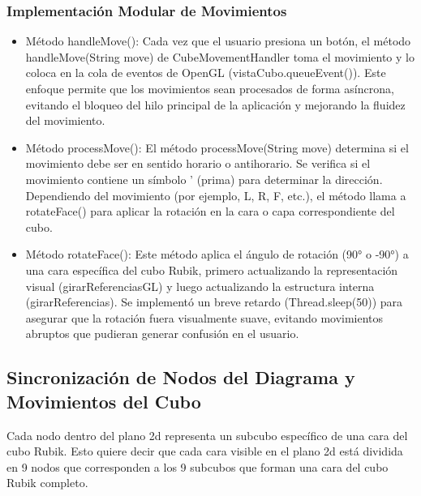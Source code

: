                                                                                                                                                                                                                                                                                                                                                                                                                                                                                                                                                                                                                                                                                                                                                                                                                                                                                                                                                                                                                                                                                                                                                                                                                                                                                                                                                                                                                                                                                                                                                                                                                                                                                                                                                                                                                                                                                                                                                                                                                                                                                                                                                                                                                                                                                                                                                                                                                                                                                                                                                                                                                                                                                                                                                                                                                                                                                                                                                                                                                                                                                                                                                                                                                                                                                                                                                                                                                                                                                                                                                                                                                                                                                                                                                                                                                                                                                                                                                                                                                                                                                                                                                                                                                                                                                                                                                                                                                                                                                                                                                                                                                                                                                                                                                                                                                                                                                                                                                                                                                                                                                                                                                                                                                                                                                                                                                                                                                                                                                                                                                                                                                                                                                                                                                                                                                                                                                                                                                                                                                                                                                                                                                                                                                                                                                                                                                                                                                                                                                                                                                                                                                                                                                                                                                                                                                                                                                                                                                                                                                                                                                                                                                                                                                                                                                                                                                                                                                                                                                                                                                                                                                                                                                                                                                                                                                                                                                                                                                                                                                                                                                                                                                                                                                                                                                                                                                                                                                                                                                                                                                                                                                                                                                                                                                                                                                                                                                                                                                                                                                                                                                                                                                                                                                                                                                                                                                                                                                                                                                                                                                                                                                                                                                                                                                                                                                                                                                                                                                                                                                                                                                                                                                                                                                                                                                                                                                                                                                                                                                                                                                                                                                                                                                                                                                                                                                                                                                                                                                                                                                                                                                                                                                                                                                                                                                                                                                                                                                                                                                                                                                                                                                                                                                                                                                                                                                                                                                                                                                                                                                                                                                                                                                                                                                                                                                                                                                                                                                                                                                                                                                                                                                                                                                                                                                                                                                                                                                                                                                                                                                                                                                                                                                                                                                                                                                                                                                                                                                                                                                                                                                                                                                                                                                                                                                                                                                                                                                                                                                                                                                                                                                                                                                                                                                                                                                                                                                                                                                                                                                                                                                                                                                                                                                                                                                                                                                                                                                                                                                                                                                                                                                                                                                                                                                                                                                                                                                                                                                                                                                                                                                                                                                                                                                                                                                                                                                                                                                                                                                                                                                                                                                                                                                                                                                                                                                                                                                                                                                                                                                                                                                                                                                                                                                                                                                                                                                                                                                                                                                                                                                                                                                                                                                                                                                                                                                                                                                                                                                                                                                                                                                                                                                                                                                                                                                                                                                                                                                                                                                                                                                                                                                                                                                                                                                                                                                                                                                                                                                                                                                                                                                                                                                                                                                                                                                                                                                                                                                                                                                                                                                                                                                                                                                                                                                                                                                                                                                                                                                                                                                                                                                                                                                                                                                                                                                                                                                                                                                                                                                                                                                                                                                                                                                                                                                                                                                                                                                                                                                                                                                                                                                                                                                                                                                                                                                                                                                                                                                                                                                                                                                                                                                                                                                                                                                                                                                                                                                                                                                                                                                                                                                                                                                                                                                                                                                                                                                                                                                                                                                                                                                                                                                                                                                                                                                                                                                                                                                                                                                                                                                                                                                                                                                                                                                                                                                                                                                                                                                                                                                                                                                                                                                                                                                                                                                                                                                                                                                                                                                                                                                                                                                                                                                                                                                                                                                                                                                                                                                                                                                                                                                                                                                                                                                                                                                                                                                                                                                                                                                                                                                                                                                                                                                                                                                                                                                                                                                                                                                                                                                                                                                                                                                                                                                                                                                                                                                                                                                                                                                                                                                                                                                                                                                                                                                                                                                                                                                                                                                                                                                                                                                                                                                                                                                                                                                                                                                                                                                                                                                                                                                                                                                                                                                                                                                                                                                                                                                                                                                                                                                                                                                                                                                                                                                                                                                                                                                                                                                                                                                                                                                                                                                                                                                                                                                                                                                                                                                                                                                                                                                                                                                                                                                                                                                                                                                                                                                                                                                                                                                                                                                                                                                                                                                                                                                                                                                                                                                                                                                                                                                                                                                                                                                                                                                                                                                                                                                                                                                                                                                                                                                                                                                                                                                                                                                                                                                                                                                                                                                                                                                                                                                                                                                                                                                                                                                                                                                                                                                                                                                                                                                                                                                                                                                                                                                                                                                                                                                                                                                                                                                                                                                                                                                                                                                                                                                                                                                                                                                                                                                                                                                                                                                                                                                                                                                                                                                                                                                                                                                                                                                                                                                                                                                                                                                                                                                                                                                                                                                                                                                                                                                                                                                                                                                                                                                                                                                                                                                                                                                                                                                                                                                                                                                                                                                                                                                                                                                                                                                                                                                                                                                                                                                                                                                                                                                                                                                                                                                                                                                                                                                                                                                                                                                                                                                                                                                                                                                                                                                                                                                                                                                                                                                                                                                                                                                                                                                                                                                                                                                                                                                                                                                                                                                                                                                                                                                                                                                                                                                                                                                                                                                                                                                                                                                                                                                                                                                                                                                                                                                                                                                                                                                                                                                                                                                                                                                                                                                                                                                                                                                                                                                                                                                                                                                                                                                                                                                                                                                                                                                                                                                                                                                                                                                                                                                                                                                                                                                                                                                                                                                                                                                                                                                                                                                                                                                                                                                                                                                                                                                                                                                                                                                                                                                                                                                                                                                                                                                                                                                                                                                                                                                                                                                                                                                                                                                                                                                                                                                                                                                                                                                                                                                                                                                                                                                                                                                                                                                                                                                                                                                                                                                                                                                                                                                                                                                                                                                                                                                                                                                                                                                                                                                                                                                                                                                                                                                                                                                                                                                                                                                                                                                                                                                                                                                                                                                                                                                                                                                                                                                                                                                                                                                                                                                                                                                                                                                                                                                                                                                                                                                                                                                                                                                                                                                                                                                                                                                                                                                                                                                                                                                                                                                                                                                                                                                                                                                                                                                                                                                                                                                                                                                                                                                                                                                                                                                                                                                                                                                                                                                                                                                                                                                                                                                                                                                                                                                                                                                                                                                                                                                                                                                                                                                                                                                                                                                                                                                                                                                                                                                                                                                                                                                                                                                                                                                                                                                                                                                                                                                                                                                                                                                                                                                                                                                                                                                                                                                                                                                                                                                                                                                                                                                                                                                                                                                                                                                                                                                                                                                                                                                                                                                                                                                                                                                                                                                                                                                                                                                                                                                                                                                                                                                                                                                                                                                                                                                                                                                                                                                                                                                                                                                                                                                                                                                                                                                                                                                                                                                                                                                                                                                                                \documentclass[conference]{IEEEtran}
\begin{document}
\subsubsection{Implementación Modular de Movimientos} 
\begin{itemize}
    \item Método handleMove(): Cada vez que el usuario presiona un botón, el método handleMove(String move) de CubeMovementHandler toma el movimiento y lo coloca en la cola de eventos de OpenGL (vistaCubo.queueEvent()). Este enfoque permite que los movimientos sean procesados de forma asíncrona, evitando el bloqueo del hilo principal de la aplicación y mejorando la fluidez del movimiento.
    \item Método processMove(): El método processMove(String move) determina si el movimiento debe ser en sentido horario o antihorario. Se verifica si el movimiento contiene un símbolo ' (prima) para determinar la dirección. Dependiendo del movimiento (por ejemplo, L, R, F, etc.), el método llama a rotateFace() para aplicar la rotación en la cara o capa correspondiente del cubo.
    \item Método rotateFace(): Este método aplica el ángulo de rotación (90° o -90°) a una cara específica del cubo Rubik, primero actualizando la representación visual (girarReferenciasGL) y luego actualizando la estructura interna (girarReferencias). Se implementó un breve retardo (Thread.sleep(50)) para asegurar que la rotación fuera visualmente suave, evitando movimientos abruptos que pudieran generar confusión en el usuario.
\end{itemize}

\subsection{Sincronización de Nodos del Diagrama y Movimientos del Cubo} 

Cada nodo dentro del plano 2d representa un subcubo específico de una cara del cubo Rubik. Esto quiere decir que cada cara visible en el plano 2d está dividida en 9 nodos que corresponden a los 9 subcubos que forman una cara del cubo Rubik completo.
\end{document}
